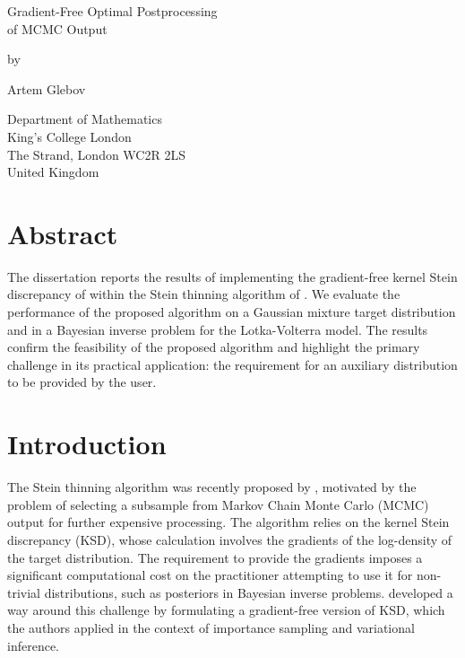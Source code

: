 \documentclass[11pt,a4paper]{report}
\date{}
\begin{document}

\thispagestyle{empty}
\begin{center}
{\huge
Gradient-Free Optimal Postprocessing \\
of MCMC Output

\bigskip
\bigskip

by
\bigskip
\bigskip

Artem Glebov
}
\end{center}
\vfill

\begin{center}
{\large
Department of Mathematics\\
King's College London\\
The Strand, London WC2R 2LS\\
United Kingdom\\
\medskip

}
\end{center}
\bigskip


\newpage
\setcounter{page}{1}
\restoregeometry

\chapter*{Abstract}

The dissertation reports the results of implementing the gradient-free kernel Stein discrepancy of \cite{fisherGradientFreeKernelStein2024} within the Stein thinning algorithm of \cite{riabizOptimalThinningMCMC2022}. We evaluate the performance of the proposed algorithm on a Gaussian mixture target distribution and in a Bayesian inverse problem for the Lotka-Volterra model. The results confirm the feasibility of the proposed algorithm and highlight the primary challenge in its practical application: the requirement for an auxiliary distribution to be provided by the user.


\tableofcontents


\chapter*{Introduction}

The Stein thinning algorithm was recently proposed by \cite{riabizOptimalThinningMCMC2022}, motivated by the problem of selecting a subsample from Markov Chain Monte Carlo (MCMC) output for further expensive processing. The algorithm relies on the kernel Stein discrepancy (KSD), whose calculation involves the gradients of the log-density of the target distribution. The requirement to provide the gradients imposes a significant computational cost on the practitioner attempting to use it for non-trivial distributions, such as posteriors in Bayesian inverse problems. \cite{fisherGradientFreeKernelStein2024} developed a way around this challenge by formulating a gradient-free version of KSD, which the authors applied in the context of importance sampling and variational inference.
\end{document}
